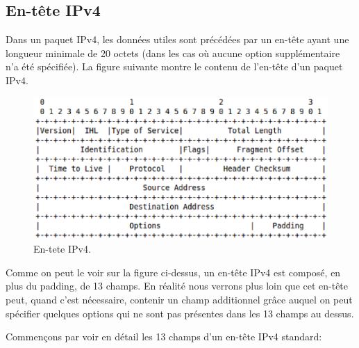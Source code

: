 
\subsection{En-tête IPv4}
Dans un paquet IPv4, les données utiles sont précédées par un en-tête ayant une longueur minimale de 20 octets 
(dans les cas où aucune option supplémentaire n'a été spécifiée).
La figure suivante montre le contenu de l'en-tête d'un paquet IPv4.

\begin{figure}[h]
\centering
\includegraphics[width=15cm]{./pics/IPv4header.eps}
\caption{En-tete IPv4.}
\label{fig:entipv4}
\end{figure}


Comme on peut le voir sur la figure ci-dessus, un en-tête IPv4 est composé, en plus du padding, de
13 champs. En réalité nous verrons plus loin que cet en-tête
peut, quand c'est nécessaire, contenir un champ additionnel grâce auquel
on peut spécifier quelques options qui ne sont pas présentes dans les 13 champs
au dessus.


Commençons par voir en détail les 13 champs d'un en-tête IPv4 standard:

